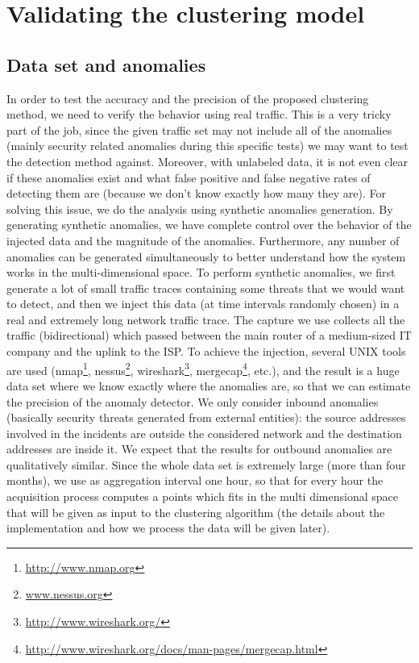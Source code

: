 \documentclass[12pt,a4paper,cucitura]{toptesi}
\begin{document}
\section{Validating the clustering model}

\subsection{Data set and anomalies}
In order to test the accuracy and the precision of the proposed clustering method, we need to verify the behavior using real traffic.
This is a very tricky part of the job, since the given traffic set may not include all of the anomalies (mainly security related anomalies during this specific tests) we may want to test the detection method against. Moreover, with unlabeled data, it is not even clear if these anomalies exist and what false positive and false negative rates of detecting them are (because we don't know exactly how many they are).
For solving this issue, we do the analysis using synthetic anomalies generation. By generating synthetic anomalies, we have complete control over the behavior of the injected data and the magnitude of the anomalies. Furthermore, any number of anomalies can be generated simultaneously to better understand how the system works in the multi-dimensional space.
To perform synthetic anomalies, we first generate a lot of small traffic traces containing some threats that we would want to detect, and then we inject this data (at time intervals randomly chosen) in a real and extremely long network traffic trace.
The capture we use collects all the traffic (bidirectional) which passed between the main router of a medium-sized IT company and the uplink to the ISP.
To achieve the injection, several UNIX tools are used (nmap\footnote{\url{http://www.nmap.org}}, nessus\footnote{\url{www.nessus.org}}, wireshark\footnote{\url{http://www.wireshark.org/}}, mergecap\footnote{\url{http://www.wireshark.org/docs/man-pages/mergecap.html}}, etc.), and the result is a huge data set where we know exactly where the anomalies are, so that we can estimate the precision of the anomaly detector.
We only consider inbound anomalies (basically security threats generated from external entities): the source addresses involved in the incidents are outside the considered network and the destination addresses are inside it. We expect that the results for outbound anomalies are qualitatively similar.
Since the whole data set is extremely large (more than four months), we use as aggregation interval one hour, so that for every hour the acquisition process computes a points which fits in the multi dimensional space that will be given as input to the clustering algorithm (the details about the implementation and how we process the data will be given later).
\end{document}
